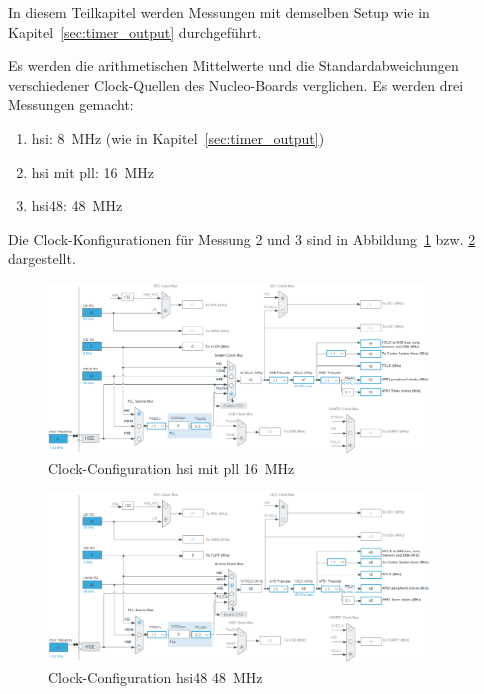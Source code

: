 In diesem Teilkapitel werden Messungen mit demselben Setup wie in Kapitel~\ref{sec:timer_output} durchgeführt.

Es werden die arithmetischen Mittelwerte und die Standardabweichungen verschiedener Clock-Quellen des Nucleo-Boards
verglichen. Es werden drei Messungen gemacht:

\begin{enumerate}
    \item \acrshort{hsi}: 8~MHz (wie in Kapitel~\ref{sec:timer_output})
    \item \acrshort{hsi} mit \acrshort{pll}: 16~MHz
    \item \acrshort{hsi}48: 48~MHz
\end{enumerate}

Die Clock-Konfigurationen für Messung 2 und 3 sind in Abbildung~\ref{fig:clock_config_hsi_pll_16mhz} bzw.
\ref{fig:clock_config_hsi48_48mhz} dargestellt.

\begin{figure}[H]
    \centering
    \includegraphics[width=0.9\textwidth]{graphics/clock_config_hsi_pll_16mhz.png}
    \caption{Clock-Configuration \acrshort{hsi} mit \acrshort{pll} 16~MHz}\label{fig:clock_config_hsi_pll_16mhz}
\end{figure}

\begin{figure}[H]
    \centering
    \includegraphics[width=0.9\textwidth]{graphics/clock_config_hsi48_48mhz.png}
    \caption{Clock-Configuration \acrshort{hsi}48 48~MHz}\label{fig:clock_config_hsi48_48mhz}
\end{figure}

